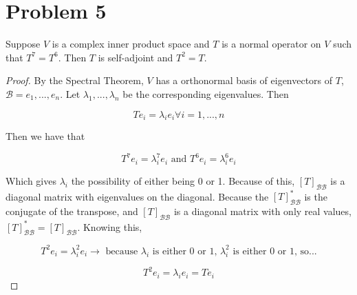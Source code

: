 \documentclass[12pt, letterpaper]{article}
\begin{document}
\section*{Problem 5}
Suppose $V$ is a complex inner product space and $T$ is a normal operator on $V$ such that $T^7 = T^6$. Then $T$ is self-adjoint and $T^2 = T$.

\begin{proof}
By the Spectral Theorem, $V$ has a orthonormal basis of eigenvectors of $T$, $\mathcal{B} = e_1, ... , e_n$. Let $\lambda_1, ... , \lambda_n$ be the corresponding eigenvalues. Then

\[ Te_i = \lambda_ie_i \forall i = 1, ... , n \]

Then we have that

\[ T^7e_i = \lambda^7_ie_i \text{ and } T^6e_i = \lambda^6_ie_i \] 

Which gives $\lambda_i$ the possibility of either being 0 or 1. Because of this, $[T]_{\mathcal{B} \mathcal{B}}$ is a diagonal matrix with eigenvalues on the diagonal. Because the $[T]^*_{\mathcal{B} \mathcal{B}}$ is the conjugate of the transpose, and $[T]_{\mathcal{B} \mathcal{B}}$ is a diagonal matrix with only real values, $[T]^*_{\mathcal{B} \mathcal{B}} = [T]_{\mathcal{B} \mathcal{B}}$. Knowing this,

\[ T^2e_i = \lambda^2_ie_i \rightarrow \text{ because $\lambda_i$ is either 0 or 1, $\lambda^2_i$ is either 0 or 1, so...} \]

\[ T^2e_i = \lambda_ie_i = Te_i \]
\end{proof}
\end{document}
